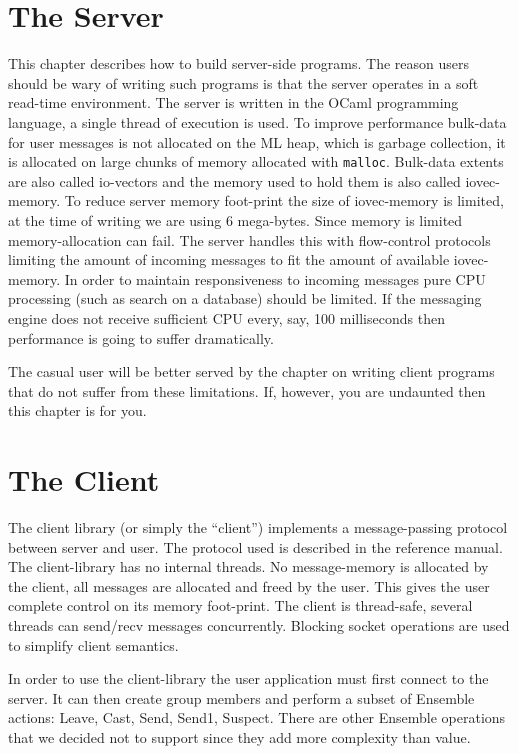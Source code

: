 \documentclass[11pt]{article}
\begin{document}
\newpage
\part{The Server}
This chapter describes how to build server-side programs. The reason
users should be wary of writing such programs is that the server
operates in a soft read-time environment. The server is written in the
OCaml programming language, a single thread of execution is used. To
improve performance bulk-data for user messages is not allocated on
the ML heap, which is garbage collection, it is allocated on large
chunks of memory allocated with {\tt malloc}. Bulk-data extents are
also called io-vectors and the memory used to hold them is also called
iovec-memory. To reduce server memory foot-print the size of
iovec-memory is limited, at the time of writing we are using 6
mega-bytes. Since memory is limited memory-allocation can fail. The
server handles this with flow-control protocols limiting the amount of
incoming messages to fit the amount of available iovec-memory. In
order to maintain responsiveness to incoming messages pure CPU
processing (such as search on a database) should be limited. If the
messaging engine does not receive sufficient CPU every, say, 100
milliseconds then performance is going to suffer dramatically.

The casual user will be better served by the chapter on writing client
programs that do not suffer from these limitations. If, however, you
are undaunted then this chapter is for you. 







\newpage
\part{The Client}
The client library (or simply the ``client'') implements a message-passing
protocol between server and user. The protocol used is described in
the reference manual. The client-library has no internal threads. No
message-memory is allocated by the client, all messages are allocated
and freed by the user. This gives the user complete control on its
memory foot-print. The client is thread-safe, several threads can
send/recv messages concurrently. Blocking socket operations are used
to simplify client semantics.

In order to use the client-library the user application must first
connect to the server. It can then create group members and perform
a subset of Ensemble actions: Leave, Cast, Send, Send1, Suspect.
There are other Ensemble operations that we decided not to support
since they add more complexity than value. 
\end{document}
